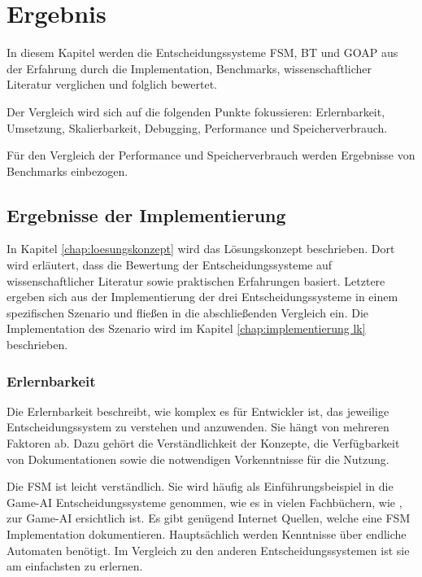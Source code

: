\chapter{Ergebnis}
\label{chap:ergebnis}

In diesem Kapitel werden die Entscheidungssysteme FSM, BT und GOAP aus der Erfahrung durch die Implementation, Benchmarks, wissenschaftlicher Literatur verglichen und folglich bewertet.

Der Vergleich wird sich auf die folgenden Punkte fokussieren: Erlernbarkeit, Umsetzung, Skalierbarkeit, Debugging, Performance und Speicherverbrauch. 

F\"{u}r den Vergleich der Performance und Speicherverbrauch werden Ergebnisse von Benchmarks einbezogen.

\section{Ergebnisse der Implementierung}

In Kapitel \ref{chap:loesungskonzept} wird das L\"{o}sungskonzept beschrieben. Dort wird erl\"{a}utert, dass die Bewertung der Entscheidungssysteme auf wissenschaftlicher Literatur sowie praktischen Erfahrungen basiert. Letztere ergeben sich aus der Implementierung der drei Entscheidungssysteme in einem spezifischen Szenario und flie\ss{}en in die abschlie\ss{}enden Vergleich ein. Die Implementation des Szenario wird im Kapitel \ref{chap:implementierung lk} beschrieben.


\subsection{Erlernbarkeit}
\label{chap:erlernbarkeit}

Die Erlernbarkeit beschreibt, wie komplex es f\"{u}r Entwickler ist, das jeweilige Entscheidungssystem zu verstehen und anzuwenden. Sie h\"{a}ngt von mehreren Faktoren ab. Dazu geh\"{o}rt die Verst\"{a}ndlichkeit der Konzepte, die Verf\"{u}gbarkeit von Dokumentationen sowie die notwendigen Vorkenntnisse f\"{u}r die Nutzung.

Die FSM ist leicht verst\"{a}ndlich. Sie wird h\"{a}ufig als Einf\"{u}hrungsbeispiel in die Game-AI Entscheidungssysteme genommen, wie es in vielen Fachb\"{u}chern, wie \autocite{AIgames, aiag}, zur Game-AI ersichtlich ist. Es gibt gen\"{u}gend Internet Quellen, welche eine FSM Implementation dokumentieren. Haupts\"{a}chlich werden Kenntnisse \"{u}ber endliche Automaten ben\"{o}tigt. Im Vergleich zu den anderen Entscheidungssystemen ist sie am einfachsten zu erlernen.

